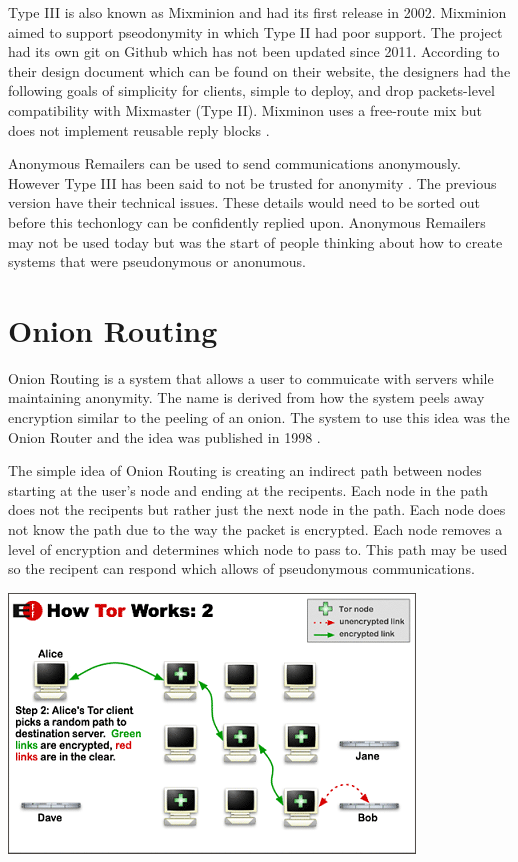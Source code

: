 \documentclass[12pt]{article}
\begin{document}
Type III is also known as Mixminion and had its first release in 2002. Mixminion aimed to support pseodonymity in which Type II had poor support. The project had its own git on Github which has not been updated since 2011. According to their design document which can be found on their website, the designers had the following goals of simplicity for clients, simple to deploy, and drop packets-level compatibility with Mixmaster (Type II).  Mixminon uses a free-route mix but does not implement reusable reply blocks \cite{GoldbertTwo}.

Anonymous Remailers can be used to send communications anonymously. However Type III  has been said to not be trusted for anonymity \cite{GoldbertTwo}. The previous version have their technical issues. These details would need to be sorted out before this techonlogy can be confidently replied upon. Anonymous Remailers may not be used today but was the start of people thinking about how to create systems that were pseudonymous or anonumous.

\section{Onion Routing}\label{}
Onion Routing is a system that allows a user to commuicate with servers while maintaining anonymity. The name is derived from how the system peels away encryption similar to the peeling of an onion. The system to use this idea was the Onion Router and the idea was published in 1998 \cite{Reed}. 

The simple idea of Onion Routing is creating an indirect path between nodes starting at the user's node and ending at the recipents. Each node in the path does not the recipents but rather just the next node in the path. Each node does not know the path due to the way the packet is encrypted. Each node removes a level of encryption and determines which node to pass to. This path may be used so the recipent can respond which allows of pseudonymous communications.


\includegraphics{tor-path}
\end{document}
